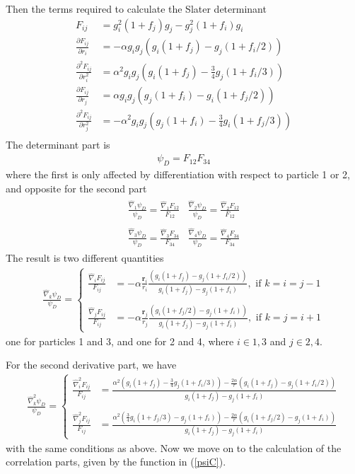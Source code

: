 \documentclass[twocolumns, a4paper,11pt,fleqn]{extarticle}
\newcommand{\eq}[1]{{\small\begin{align*}#1\end{align*}}}
\newcommand{\mat}[1]{\begin{matrix}#1\end{matrix}}
\renewcommand\vec[1]{\boldsymbol{\mathbf{#1}}}
\newcommand{\op}[1]{\hat{#1}}
\begin{document}
Then the terms required to calculate the Slater determinant
\eq{
  F_{ij} &= g_i^2 (1+f_j)g_j - g_j^2 (1+f_i)g_i\\
  \frac{\partial F_{ij}}{\partial r_i} 
    &= -\alpha g_i g_j (g_i(1+f_j) - g_j (1+f_i/2))\\
  \frac{\partial^2 F_{ij}}{\partial r_i^2} 
    &= \alpha^2 g_i g_j (g_i(1+f_j) - \frac{3}{4} g_j (1+f_i/3))\\
  \frac{\partial F_{ij}}{\partial r_j} 
    &= \alpha g_i g_j (g_j(1+f_i) - g_i (1+f_j/2))\\
  \frac{\partial^2 F_{ij}}{\partial r_j^2} 
    &= -\alpha^2 g_i g_j (g_j(1+f_i) - \frac{3}{4} g_i (1+f_j/3))\\
}
The determinant part is
\eq{
  \psi_D = F_{12}F_{34}
}
where the first is only affected by differentiation with respect to particle 1 or 2,
and opposite for the second part
\eq{
  \mat{
    \frac{\op\nabla_1 \psi_D}{\psi_D} = \frac{\op\nabla_1 F_{12}}{F_{12}} &
    \frac{\op\nabla_2 \psi_D}{\psi_D} = \frac{\op\nabla_2 F_{12}}{F_{12}} \\\\
    \frac{\op\nabla_3 \psi_D}{\psi_D} = \frac{\op\nabla_3 F_{34}}{F_{34}} &
    \frac{\op\nabla_4 \psi_D}{\psi_D} = \frac{\op\nabla_4 F_{34}}{F_{34}}
  }
}
The result is two different quantities
\eq{
  \frac{\op\nabla_k \psi_D}{\psi_D} =
  \begin{cases}
    \frac{\op\nabla_i F_{ij}}{F_{ij}}
    &= -\alpha \frac{\vec r_i}{r_i} \frac{(g_i(1+f_j) 
      - g_j (1+f_i/2))}{g_i (1+f_j) - g_j (1+f_i)}
    ,\text{ if } k=i=j-1 \\\\
    \frac{\op\nabla_j F_{ij}}{F_{ij}}
    &= -\alpha \frac{\vec r_j}{r_j}\frac{(g_i (1+f_j/2) 
      - g_j(1+f_i))}{g_i (1+f_j) - g_j (1+f_i)}
    ,\text{ if } k=j=i+1
  \end{cases}
}
one for particles 1 and 3, and one for 2 and 4, where $i\in {1,3}$ and $j\in {2,4}$.

For the second derivative part, we have 
\eq{
  \frac{\op\nabla_k^2 \psi_D}{\psi_D} =
  \begin{cases}
    \frac{\op\nabla_i^2 F_{ij}}{F_{ij}}
    &= \frac{\alpha^2 (g_i(1+f_j) 
      - \frac{3}{4} g_j (1+f_i/3)) - \frac{2\alpha}{r}(g_i(1+f_j) - g_j (1+f_i/2))}
      {g_i (1+f_j) - g_j (1+f_i)}\\\\
    \frac{\op\nabla_j^2 F_{ij}}{F_{ij}}
    &= \frac{\alpha^2 (\frac{3}{4}g_i(1+f_j/3) 
      - g_j (1+f_i)) - \frac{2\alpha}{r}(g_i (1+f_j/2) 
      - g_j(1+f_i))}
      {g_i (1+f_j) - g_j (1+f_i)}
  \end{cases}
}
with the same conditions as above.
Now we move on to the calculation of the correlation parts,
given by the function in (\ref{psiC}). 
\end{document}
